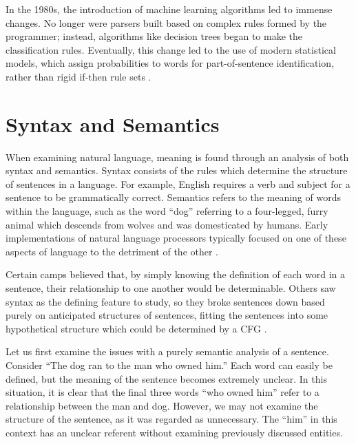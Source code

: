 In the 1980s, the introduction of machine learning algorithms led to immense changes. No longer were parsers built based on complex rules formed by the programmer; instead, algorithms like decision trees began to make the classification rules. Eventually, this change led to the use of modern statistical models, which assign probabilities to words for part-of-sentence identification, rather than rigid if-then rule sets \cite{1980}.

\section{Syntax and Semantics}

When examining natural language, meaning is found through an analysis of both syntax and semantics. Syntax consists of the rules which determine the structure of sentences in a language. For example, English requires a verb and subject for a sentence to be grammatically correct. Semantics refers to the meaning of words within the language, such as the word ``dog'' referring to a four-legged, furry animal which descends from wolves and was domesticated by humans. Early implementations of natural language processors typically focused on one of these aspects of language to the detriment of the other \cite{lytinen}.

Certain camps believed that, by simply knowing the definition of each word in a sentence, their relationship to one another would be determinable. Others saw syntax as the defining feature to study, so they broke sentences down based purely on anticipated structures of sentences, fitting the sentences into some hypothetical structure which could be determined by a CFG \cite{lytinen}.

Let us first examine the issues with a purely semantic analysis of a sentence. Consider ``The dog ran to the man who owned him.'' Each word can easily be defined, but the meaning of the sentence becomes extremely unclear. In this situation, it is clear that the final three words ``who owned him'' refer to a relationship between the man and dog. However, we may not examine the structure of the sentence, as it was regarded as unnecessary. The ``him'' in this context has an unclear referent without examining previously discussed entities.

